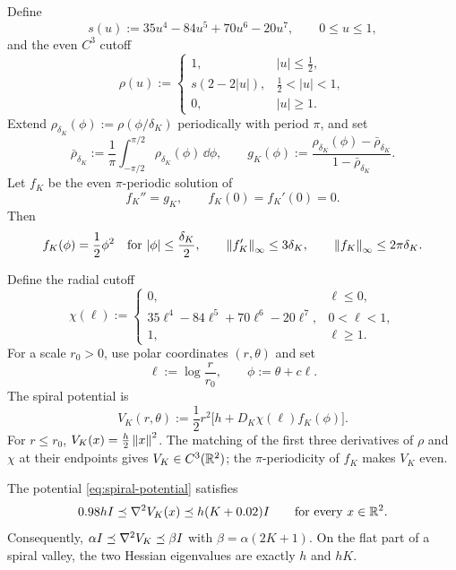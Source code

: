 Define
\[
    s(u):=35u^4-84u^5+70u^6-20u^7,
    \qquad 0\leq u\leq1,
\]
and the even $C^3$ cutoff
\begin{equation}
\label{eq:phase-bump}
    \rho(u):=
    \begin{cases}
        1, & |u|\leq\tfrac12,\\[1mm]
        s(2-2|u|), & \tfrac12<|u|<1,\\[1mm]
        0, & |u|\geq1.
    \end{cases}
\end{equation}
Extend $\rho_{\delta_K}(\phi):=\rho(\phi/\delta_K)$ periodically with period $\pi$, and set
\[
    \bar\rho_{\delta_K}
    :=\frac1\pi\int_{-\pi/2}^{\pi/2}\rho_{\delta_K}(\phi)\,\dd\phi,
    \qquad
    g_K(\phi)
    :=\frac{\rho_{\delta_K}(\phi)-\bar\rho_{\delta_K}}
            {1-\bar\rho_{\delta_K}}.
\]
Let $f_K$ be the even $\pi$-periodic solution of
\begin{equation}
\label{eq:fK}
    f_K''=g_K,
    \qquad
    f_K(0)=f_K'(0)=0.
\end{equation}
Then
\begin{equation}
\label{eq:fK-core-bounds}
    f_K(\phi)=\frac12\phi^2
    \quad\text{for }|\phi|\leq\frac{\delta_K}{2},
    \qquad
    \left\lVert f_K'\right\rVert_\infty\leq3\delta_K,
    \qquad
    \left\lVert f_K\right\rVert_\infty\leq2\pi\delta_K.
\end{equation}

Define the radial cutoff
\begin{equation}
\label{eq:radial-cutoff}
    \chi(\ell):=
    \begin{cases}
        0, & \ell\leq0,\\
        35\ell^4-84\ell^5+70\ell^6-20\ell^7,
            & 0<\ell<1,\\
        1, & \ell\geq1.
    \end{cases}
\end{equation}
For a scale $r_0>0$, use polar coordinates $(r,\theta)$ and set
\[
    \ell:=\log\frac r{r_0},
    \qquad
    \phi:=\theta+c\ell.
\]
The spiral potential is
\begin{equation}
\label{eq:spiral-potential}
    \boxed{
    V_K(r,\theta)
    :=\frac12r^2\bigl[h+D_K\chi(\ell)f_K(\phi)\bigr].}
\end{equation}
For $r\leq r_0$, $V_K(x)=\tfrac h2\left\lVert x\right\rVert^2$.  The matching of the first three derivatives of
$\rho$ and $\chi$ at their endpoints gives $V_K\in C^3(\mathbb{R}^2)$; the $\pi$-periodicity of $f_K$
makes $V_K$ even.

\begin{lemma}
\label{lem:spiral-Hessian}
The potential \eqref{eq:spiral-potential} satisfies
\begin{equation}
\label{eq:spiral-Hessian-bounds}
    0.98hI\preceq\nabla^2V_K(x)\preceq h(K+0.02)I
    \qquad\text{for every }x\in\mathbb{R}^2.
\end{equation}
Consequently,
$\alpha I\preceq\nabla^2V_K\preceq\beta I$ with $\beta=\alpha(2K+1)$.
On the flat part of a spiral valley, the two Hessian eigenvalues are exactly $h$ and $hK$.
\end{lemma}

